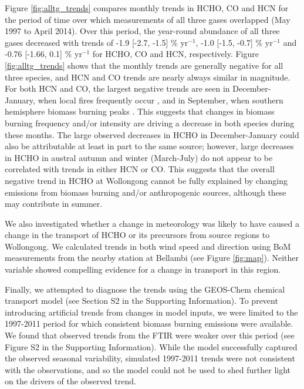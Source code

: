 \documentclass[draft,linenumbers]{AGUJournal}
\begin{document}
Figure \ref{fig:alltg_trends} compares monthly trends in HCHO, CO and HCN for the period of time over which measurements of all three gases overlapped (May 1997 to April 2014). Over this period, the year-round abundance of all three gases decreased with trends of -1.9 [-2.7, -1.5] \% yr$^{-1}$, -1.0 [-1.5, -0.7] \% yr$^{-1}$ and -0.76 [-1.66, 0.1] \% yr$^{-1}$ for HCHO, CO and HCN, respectively. Figure \ref{fig:alltg_trends} shows that the monthly trends are generally negative for all three species, and HCN and CO trends are nearly always similar in magnitude. For both HCN and CO, the largest negative trends are seen in December-January, when local fires frequently occur \citep{Zeng2015,Paton-Walsh2004,Paton-Walsh2005,Paton-Walsh2010,Rea2016}, and in September, when southern hemisphere biomass burning peaks \citep{Edwards2006}. This suggests that changes in biomass burning frequency and/or intensity are driving a decrease in both species during these months. The large observed decreases in HCHO in December-January could also be attributable at least in part to the same source; however, large decreases in HCHO in austral autumn and winter (March-July) do not appear to be correlated with trends in either HCN or CO. This suggests that the overall negative trend in HCHO at Wollongong cannot be fully explained by changing emissions from  biomass burning and/or anthropogenic sources, although these may contribute in summer.

We also investigated whether a change in meteorology was likely to have caused a change in the transport of HCHO or its precursors from source regions to Wollongong. We calculated trends in both wind speed and direction using BoM measurements from the nearby station at Bellambi (see Figure \ref{fig:map}). Neither variable showed compelling evidence for a change in transport in this region.

Finally, we attempted to diagnose the trends using the GEOS-Chem chemical transport model (see Section S2 in the Supporting Information). To prevent introducing artificial trends from changes in model inputs, we were limited to the 1997-2011 period for which consistent biomass burning emissions were available. We found that observed trends from the FTIR were weaker over this period (see Figure S2 in the Supporting Information). While the model successfully captured the observed seasonal variability, simulated 1997-2011 trends were not consistent with the observations, and so the model could not be used to shed further light on the drivers of the observed trend.
\end{document}
